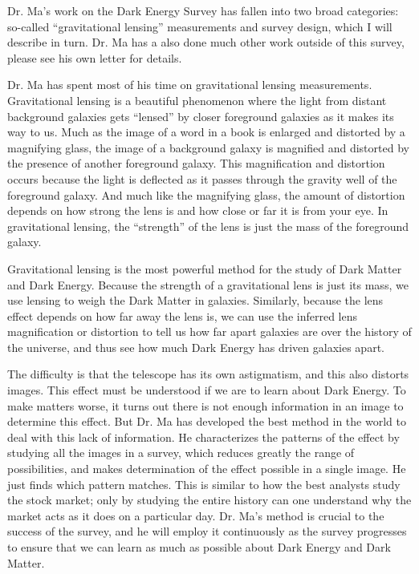 \documentclass[12pt]{letter}
\begin{document}
Dr. Ma's work on the Dark Energy Survey has fallen into two broad categories:
so-called ``gravitational lensing'' measurements and survey design, which I
will describe in turn.  Dr. Ma has a also done much other work outside
of this survey, please see his own letter for details.

Dr. Ma has spent most of his time on gravitational lensing measurements.
Gravitational lensing is a beautiful phenomenon where the light from distant
background galaxies gets ``lensed'' by closer foreground galaxies as it makes
its way to us.  Much as the image of a word in a book is enlarged and distorted
by a magnifying glass, the image of a background galaxy is magnified and
distorted by the presence of another foreground galaxy.  This magnification and
distortion occurs because the light is deflected as it passes through the
gravity well of the foreground galaxy.  And much like the magnifying glass, the
amount of distortion depends on how strong the lens is and how close or far it
is from your eye.  In gravitational lensing, the ``strength'' of the lens is
just the mass of the foreground galaxy.

Gravitational lensing is the most powerful method for the study of Dark Matter
and Dark Energy.  Because the strength of a gravitational lens is just its
mass, we use lensing to weigh the Dark Matter in galaxies.  Similarly, because
the lens effect depends on how far away the lens is, we can use the inferred
lens magnification or distortion to tell us how far apart galaxies are over the
history of the universe, and thus see how much Dark Energy has driven galaxies
apart.

The difficulty is that the telescope has its own astigmatism, and this also
distorts images.  This effect must be understood if we are to learn about Dark
Energy.  To make matters worse, it turns out there is not enough information in
an image to determine this effect.  But Dr. Ma has developed the best method in
the world to deal with this lack of information.  He characterizes the patterns
of the effect by studying all the images in a survey, which reduces greatly the
range of possibilities, and makes determination of the effect possible in a
single image.  He just finds which pattern matches.  This is similar to how the
best analysts study the stock market; only by studying the entire history can
one understand why the market acts as it does on a particular day.  Dr. Ma's
method is crucial to the success of the survey, and he will employ it
continuously as the survey progresses to ensure that we can learn as much as
possible about Dark Energy and Dark Matter.
\end{document}
